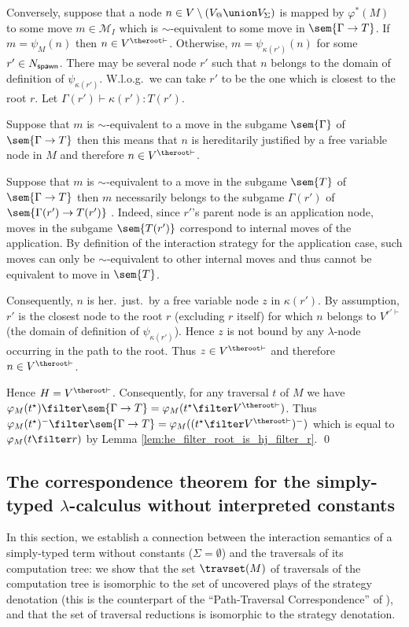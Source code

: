 Conversely, suppose that a node $n \in V\setminus (V_@\union V_\Sigma)$ is mapped by
$\varphi^*(M)$ to some move $m\in \mathcal{M}_I$ which is $\sim$-equivalent
to some move in $\sem{\Gamma \rightarrow T}$.
 If $m = \psi_M(n)$ then $n\in V^{\theroot\vdash}$. Otherwise,
$m = \psi_{\kappa(r')}(n)$ for some $r' \in N_{\sf spawn}$. There
may be several node $r'$ such that $n$ belongs to the domain of
definition of $\psi_{\kappa(r')}$. W.l.o.g.\ we can take $r'$ to be
the one which is closest to the root $r$. Let $\Gamma(r') \vdash
\kappa(r') : T(r')$.
    \begin{compactitem}
    \item Suppose that $m$ is $\sim$-equivalent to a move in the subgame $\sem{\Gamma}$ of $\sem{\Gamma \rightarrow T}$
    then this means that $n$ is hereditarily justified by a free variable node in $M$ and therefore $n \in V^{\theroot\vdash}$.

    \item Suppose that $m$ is $\sim$-equivalent to a move in the subgame $\sem{T}$ of $\sem{\Gamma \rightarrow T}$
    then $m$ necessarily belongs to the subgame $\Gamma(r')$ of $\sem{\Gamma(r')\rightarrow T(r')}$ .
    Indeed, since $r'$'s parent node is an application node, moves in the subgame
    $\sem{T(r')}$ correspond to internal moves of the application. By definition of
    the interaction strategy for the application case, such moves can only be $\sim$-equivalent to other internal
    moves and thus cannot be equivalent to move in $\sem{T}$.

    Consequently, $n$ is her.\ just.\ by a free variable node $z$ in $\kappa(r')$. By assumption, $r'$ is the closest node to the root $r$ (excluding $r$ itself) for which $n$ belongs to $V^{r'\vdash}$ (the domain of definition of $\psi_{\kappa(r')}$). Hence $z$ is not bound by any $\lambda$-node occurring in the path to the root. Thus $z\in
    V^{\theroot\vdash}$ and therefore $n \in V^{\theroot\vdash}$.
    \end{compactitem}
Hence $H = V^{\theroot\vdash}$. Consequently, for any traversal $t$
of $M$ we have $\varphi_M(t^\star) \filter \sem{\Gamma \rightarrow
T} = \varphi_M(t^\star\filter V^{\theroot\vdash})$. Thus
$\varphi_M(t^\star)^- \filter \sem{\Gamma \rightarrow T} =
\varphi_M((t^\star\filter V^{\theroot\vdash})^-)$ which is equal to
$ \varphi_M(t\filter r)$ by Lemma
\ref{lem:he_filter_root_is_hj_filter_r}. \qed


\subsection{The correspondence theorem for the simply-typed $\lambda$-calculus without interpreted constants}
In this section, we establish a connection between the interaction
semantics of a simply-typed term without constants ($\Sigma =
\emptyset$) and the traversals of its computation tree: we show that
the set $\travset(M)$ of traversals of the computation tree is
isomorphic to the set of uncovered plays of the strategy denotation
(this is the counterpart of the ``Path-Traversal Correspondence'' of
\cite{OngLics2006}), and that the set of traversal reductions is
isomorphic to the strategy denotation.


